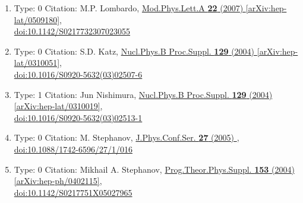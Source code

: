 \documentclass[a4paper,10pt]{article}
\begin{document}
\begin{enumerate}
\begin{enumerate}
  \item Type: 0 Citation: M.P. Lombardo, \href{https://www.doi.org/10.1142/S0217732307023055}{Mod.Phys.Lett.A {\bf 22} (2007) }  \href{https://arxiv.org/abs/hep-lat/0509180}{[arXiv:hep-lat/0509180]},\\\href{https://www.doi.org/10.1142/S0217732307023055}{doi:10.1142/S0217732307023055}
  \item Type: 0 Citation: S.D. Katz, \href{https://www.doi.org/10.1016/S0920-5632(03)02507-6}{Nucl.Phys.B Proc.Suppl. {\bf 129} (2004) }  \href{https://arxiv.org/abs/hep-lat/0310051}{[arXiv:hep-lat/0310051]},\\\href{https://www.doi.org/10.1016/S0920-5632(03)02507-6}{doi:10.1016/S0920-5632(03)02507-6}
  \item Type: 1 Citation: Jun Nishimura, \href{https://www.doi.org/10.1016/S0920-5632(03)02513-1}{Nucl.Phys.B Proc.Suppl. {\bf 129} (2004) }  \href{https://arxiv.org/abs/hep-lat/0310019}{[arXiv:hep-lat/0310019]},\\\href{https://www.doi.org/10.1016/S0920-5632(03)02513-1}{doi:10.1016/S0920-5632(03)02513-1}
  \item Type: 0 Citation: M. Stephanov, \href{https://www.doi.org/10.1088/1742-6596/27/1/016}{J.Phys.Conf.Ser. {\bf 27} (2005) },\\\href{https://www.doi.org/10.1088/1742-6596/27/1/016}{doi:10.1088/1742-6596/27/1/016}
  \item Type: 0 Citation: Mikhail A. Stephanov, \href{https://www.doi.org/10.1142/S0217751X05027965}{Prog.Theor.Phys.Suppl. {\bf 153} (2004) }  \href{https://arxiv.org/abs/hep-ph/0402115}{[arXiv:hep-ph/0402115]},\\\href{https://www.doi.org/10.1142/S0217751X05027965}{doi:10.1142/S0217751X05027965}

\end{enumerate}
\end{enumerate}
\end{document}
